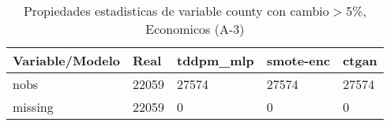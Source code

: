 \begin{table}[H]
\centering
\fontsize{8}{14}\selectfont
\caption{Propiedades estadisticas de variable county con cambio\ensuremath{>}5\%, Economicos (A-3)}
\label{table-stats-economicos-a-3-county-short}
\begin{tabular}{|l|m{10em}|m{10em}|m{10em}|m{10em}|}
\hline
 \rowcolor[gray]{0.8}
Variable/Modelo & Real & tddpm\_mlp & smote-enc & ctgan \\
\hline nobs & 22059 & 27574 & 27574 & 27574 \\
\hline missing & 22059 & 0 & 0 & 0 \\
\hline
\end{tabular}
\end{table}
